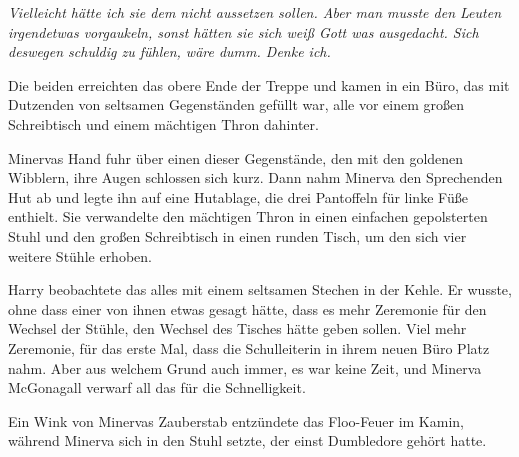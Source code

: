 \emph{Vielleicht hätte ich sie dem nicht aussetzen sollen. Aber man musste den Leuten \emph{irgendetwas} vorgaukeln, sonst hätten sie sich weiß Gott was ausgedacht. Sich deswegen schuldig zu fühlen, wäre dumm. Denke ich.}

Die beiden erreichten das obere Ende der Treppe und kamen in ein Büro, das mit Dutzenden von seltsamen Gegenständen gefüllt war, alle vor einem großen Schreibtisch und einem mächtigen Thron dahinter.

Minervas Hand fuhr über einen dieser Gegenstände, den mit den goldenen Wibblern, ihre Augen schlossen sich kurz.
Dann nahm Minerva den Sprechenden Hut ab und legte ihn auf eine Hutablage, die drei Pantoffeln für linke Füße enthielt. Sie verwandelte den mächtigen Thron in einen einfachen gepolsterten Stuhl und den großen Schreibtisch in einen runden Tisch, um den sich vier weitere Stühle erhoben.

Harry beobachtete das alles mit einem seltsamen Stechen in der Kehle. Er wusste, ohne dass einer von ihnen etwas gesagt hätte, dass es mehr Zeremonie für den Wechsel der Stühle, den Wechsel des Tisches hätte geben sollen. Viel mehr Zeremonie, für das erste Mal, dass die Schulleiterin in ihrem neuen Büro Platz nahm. Aber aus welchem Grund auch immer, es war keine Zeit, und Minerva McGonagall verwarf all das für die Schnelligkeit.

Ein Wink von Minervas Zauberstab entzündete das Floo-Feuer im Kamin, während Minerva sich in den Stuhl setzte, der einst Dumbledore gehört hatte.

